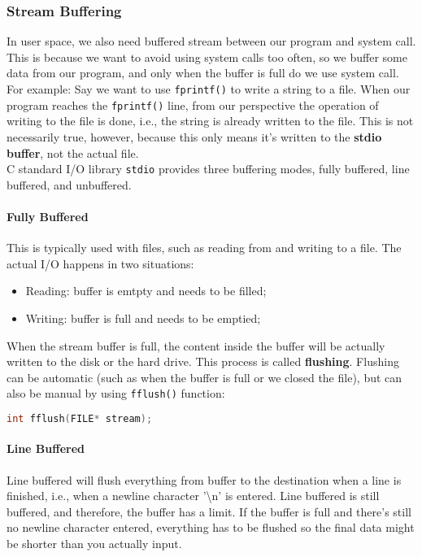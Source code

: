 \documentclass{article}
\newcommand{\bold}[1]{\textbf{#1}}
\renewcommand{\b}{\item[$\circ$]}
\newcommand{\newlist}{\begin{itemize}}
\renewcommand{\endlist}{\end{itemize}}
\newcommand{\code}[1]{\texttt{#1}}
\begin{document}
\subsubsection{Stream Buffering}

In user space, we also need buffered stream between our program and system call. This is because we want to avoid using system calls too often, so we buffer some data from our program, and only when the buffer is full do we use system call. For example: Say we want to use \code{fprintf()} to write a string to a file. When our program reaches the \code{fprintf()} line, from our perspective the operation of writing to the file is done, i.e., the string is already written to the file. This is not necessarily true, however, because this only means it's written to the \bold{stdio buffer}, not the actual file. \\

C standard I/O library \code{stdio} provides three buffering modes, fully buffered, line buffered, and unbuffered. \\

\paragraph{Fully Buffered}

This is typically used with files, such as reading from and writing to a file. The actual I/O happens in two situations: 

\newlist
\b Reading: buffer is emtpty and needs to be filled;
\b Writing: buffer is full and needs to be emptied;
\endlist

When the stream buffer is full, the content inside the buffer will be actually written to the disk or the hard drive. This process is called \bold{flushing}. Flushing can be automatic (such as when the buffer is full or we closed the file), but can also be manual by using \code{fflush()} function:

\begin{lstlisting}[language=C]
int fflush(FILE* stream);
\end{lstlisting}

\paragraph{Line Buffered}

Line buffered will flush everything from buffer to the destination when a line is finished, i.e., when a newline character '\textbackslash n' is entered. Line buffered is still buffered, and therefore, the buffer has a limit. If the buffer is full and there's still no newline character entered, everything has to be flushed so the final data might be shorter than you actually input. 
\end{document}
